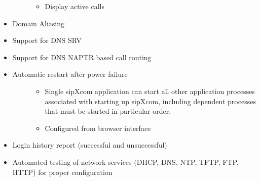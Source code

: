 \documentclass[letterpaper,10pt,english]{sphinxmanual}
\begin{document}
\begin{itemize}
\begin{description}
\begin{itemize}
\item {} 
Display active calls

\end{itemize}

\end{description}

\item {} 
Domain Aliasing

\item {} 
Support for DNS SRV

\item {} 
Support for DNS NAPTR based call routing

\item {} \begin{description}
\item[{Automatic restart after power failure}] \leavevmode\begin{itemize}
\item {} 
Single sipXcom application can start all other application processes associated with starting up sipXcom, including dependent processes that must be started in particular order.

\item {} 
Configured from browser interface

\end{itemize}

\end{description}

\item {} 
Login history report (successful and unsuccessful)

\item {} 
Automated testing of network services (DHCP, DNS, NTP, TFTP, FTP, HTTP) for proper configuration

\end{itemize}
\end{document}
